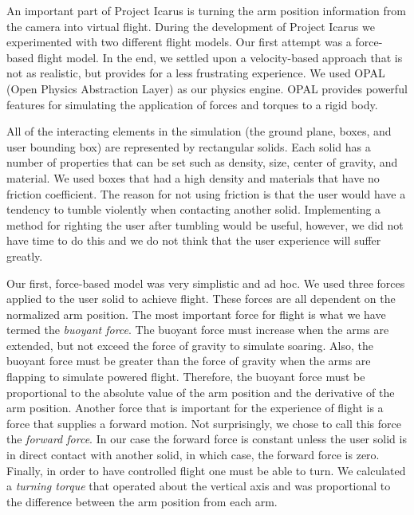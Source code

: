 \documentclass{article}
\begin{document}
An important part of Project Icarus is turning the arm position information
from the camera into virtual flight.  During the development of Project Icarus
we experimented with two different flight models.  Our first attempt was a
force-based flight model.  In the end, we settled upon a velocity-based
approach that is not as realistic, but provides for a less frustrating
experience.  We used OPAL (Open Physics Abstraction Layer) as our physics
engine.  OPAL provides powerful features for simulating the application of
forces and torques to a rigid body.  

All of the interacting elements in the simulation (the ground plane, boxes, and
user bounding box) are represented by rectangular solids.  Each solid has a
number of properties that can be set such as density, size, center of gravity,
and material.  We used boxes that had a high density and materials that have no
friction coefficient.  The reason for not using friction is that the user would
have a tendency to tumble violently when contacting another solid.
Implementing a method for righting the user after tumbling would be useful,
however, we did not have time to do this and we do not think that the user
experience will suffer greatly.

Our first, force-based model was very simplistic and ad hoc.  We used three
forces applied to the user solid to achieve flight.  These forces are all
dependent on the normalized arm position.  The most important force for flight
is what we have termed the \emph{buoyant force}.  The buoyant force must increase when
the arms are extended, but not exceed the force of gravity to simulate soaring.
Also, the buoyant force must be greater than the force of gravity when the arms
are flapping to simulate powered flight.  Therefore, the buoyant force must be
proportional to the absolute value of the arm position and the derivative of
the arm position.  Another force that is important for the experience of flight
is a force that supplies a forward motion.  Not surprisingly, we chose to call
this force the \emph{forward force}.  In our case the forward force is constant unless
the user solid is in direct contact with another solid, in which case, the
forward force is zero.  Finally, in order to have controlled flight one must be
able to turn.  We calculated a \emph{turning torque} that operated about the vertical
axis and was proportional to the difference between the arm position from each
arm.
\end{document}
